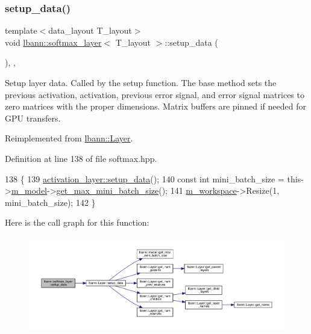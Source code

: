 \subsubsection{\texorpdfstring{setup\+\_\+data()}{setup\_data()}}
{\footnotesize\ttfamily template$<$data\+\_\+layout T\+\_\+layout$>$ \\
void \hyperlink{classlbann_1_1softmax__layer}{lbann\+::softmax\+\_\+layer}$<$ T\+\_\+layout $>$\+::setup\+\_\+data (\begin{DoxyParamCaption}{ }\end{DoxyParamCaption})\hspace{0.3cm}{\ttfamily [inline]}, {\ttfamily [override]}, {\ttfamily [virtual]}}

Setup layer data. Called by the setup function. The base method sets the previous activation, activation, previous error signal, and error signal matrices to zero matrices with the proper dimensions. Matrix buffers are pinned if needed for G\+PU transfers. 

Reimplemented from \hyperlink{classlbann_1_1Layer_a50a89f8a68762c677d48efe384676e81}{lbann\+::\+Layer}.



Definition at line 138 of file softmax.\+hpp.


\begin{DoxyCode}
138                              \{
139     \hyperlink{classlbann_1_1Layer_a50a89f8a68762c677d48efe384676e81}{activation\_layer::setup\_data}();
140     \textcolor{keyword}{const} \textcolor{keywordtype}{int} mini\_batch\_size = this->\hyperlink{classlbann_1_1Layer_a3d9315e99574166f2f33e37b572021d2}{m\_model}->\hyperlink{classlbann_1_1model_a8c311798ff4acaeafdfbf85162ba5084}{get\_max\_mini\_batch\_size}();
141     \hyperlink{classlbann_1_1softmax__layer_a604e614de25758f0072308c7efdd5bdb}{m\_workspace}->Resize(1, mini\_batch\_size);
142   \}
\end{DoxyCode}
Here is the call graph for this function\+:\nopagebreak
\begin{figure}[H]
\begin{center}
\leavevmode
\includegraphics[width=350pt]{classlbann_1_1softmax__layer_a4cc8f1f44a2854e78dad4f898d66a5ac_cgraph}
\end{center}
\end{figure}
\mbox{\label{classlbann_1_1softmax__layer_ad011596d678ba62d3a92b0e9b2acae54}} 
